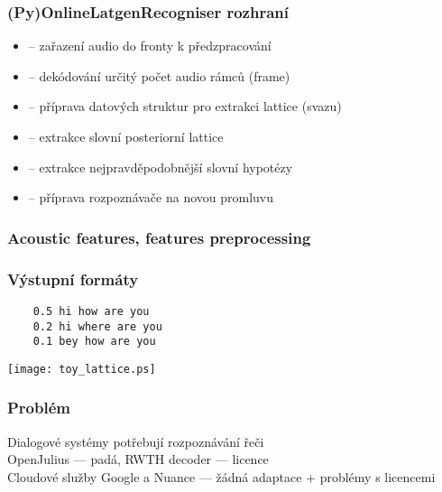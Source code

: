 \begin{frame}\frametitle{(Py)OnlineLatgenRecogniser rozhraní} 
    \begin{itemize}
        \item {} -- zařazení audio do fronty k předzpracování
        \item {} -- dekódování určitý počet audio rámců (frame)
        \item {} -- příprava datových struktur pro extrakci lattice (svazu)
        \item {} -- extrakce slovní posteriorní lattice
        \item {} -- extrakce nejpravděpodobnější slovní hypotézy
        \item {} -- příprava rozpoznávače na novou promluvu
    \end{itemize}
\end{frame}



\begin{frame}\frametitle{Acoustic features, features preprocessing} 
    
    
\end{frame}

\begin{frame}[fragile]\frametitle{Výstupní formáty} 

    \begin{verbatim}
    0.5 hi how are you
    0.2 hi where are you
    0.1 bey how are you
\end{verbatim}

    \begin{center}
        \texttt{[image: toy\_lattice.ps]}
    \end{center}
\end{frame}


\begin{frame}\frametitle{Problém} 
    Dialogové systémy potřebují rozpoznávání řeči \\
    OpenJulius --- padá, RWTH decoder --- licence \\
    Cloudové služby Google a Nuance --- žádná adaptace + problémy s licencemi 
\end{frame}

